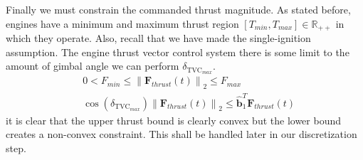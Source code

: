 Finally we must constrain the commanded thrust magnitude. As stated before, engines have a minimum and maximum thrust region $[T_{min}, T_{max}] \in \mathbb{R}_{++}$ in which they operate. Also, recall that we have made the single-ignition assumption. The engine thrust vector control system there is some limit to the amount of gimbal angle we can perform $\delta_{\text{TVC}_{max}}$.
\begin{align}
& 0 < F_{min} \leq \left \lVert \bm{F}_{thrust}(t) \right \lVert_2 \leq F_{max} \\
& \cos(\delta_{\text{TVC}_{max}}) \left \lVert \bm{F}_{thrust}(t) \right \lVert_2 \leq \hat{\bm{b}}_1^T \bm{F}_{thrust}(t)
\end{align}
it is clear that the upper thrust bound is clearly convex but the lower bound creates a non-convex constraint. This shall be handled later in our discretization step.

%
